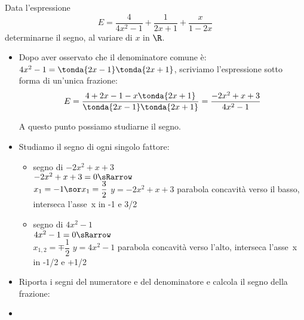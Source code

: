 \begin{esempio}{}{}
Data l'espressione 
\[E=\dfrac{4}{4x^2-1}+\dfrac {1}{2x+1}+\dfrac{x}{1-2x}\]
determinarne il segno, al variare di \(x\) in \(\R\).


\begin{itemize}

\item Dopo aver osservato che il denominatore comune è:
\(4x^2-1 =\tonda{2x-1}\tonda{2x+1}\), scriviamo 
l'espressione sotto forma di un'unica frazione:
\[E=\dfrac{4+2x-1 - x \tonda{2x+1}}{\tonda{2x-1}\tonda{2x+1}} =
\dfrac{-2x^2+x+3}{4x^2-1}\]

A questo punto possiamo studiarne il segno.

 \item Studiamo il segno di ogni singolo fattore:

\begin{itemize}

 \item  segno di \(-2x^2+x+3\)\\
 \segnofatt
   {\(-2x^2+x+3=0 \sRarrow\)\\
  \(x_1=-1 \sor x_1=\dfrac{3}{2}\)}
   {\(y=-2x^2+x+3\)}
   {parabola concavità verso il basso, interseca l'asse~x in -1 e 3/2}
   {}
 \item segno di \(4x^2-1\)\\
 \segnofatt
   {\(4x^2-1=0 \sRarrow \) \\
  \(x_{1,2}=\mp\dfrac{1}{2}\)}
   {\(y=4x^2-1\)}
   {parabola concavità verso l'alto, interseca l'asse~x in -1/2 e +1/2}
   {}
\end{itemize}
 \item Riporta i segni del numeratore e del denominatore e calcola
il segno della frazione:

\begin{inaccessibleblock}
  \begin{center}
  \segnofrazioneb
  \end{center}
\end{inaccessibleblock}
\item 
\end{itemize}
\end{esempio}

